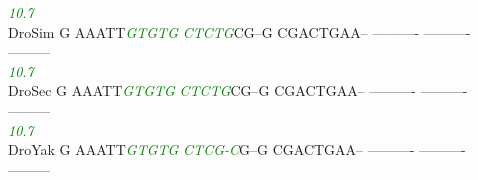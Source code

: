 \documentclass[11pt,twoside,reqno,a4paper]{article}
\begin{document}
{\hspace*{7\charwidth}\hspace*{1\charwidth}\hspace*{6\charwidth}\textit{\textcolor{Green}{10.7}}\hspace*{1\charwidth}\hspace*{1\charwidth}\hspace*{1\charwidth}\hspace*{1\charwidth}\hspace*{1\charwidth}\\
DroSim	G	AAATT\textit{\textcolor{Green}{G}}\textit{\textcolor{Green}{T}}\textit{\textcolor{Green}{G}}\textit{\textcolor{Green}{T}}\textit{\textcolor{Green}{G}}	\textit{\textcolor{Green}{C}}\textit{\textcolor{Green}{T}}\textit{\textcolor{Green}{C}}\textit{\textcolor{Green}{T}}\textit{\textcolor{Green}{G}}CG--G	CGACTGAA--	----------	----------	---------\\
\hspace*{7\charwidth}\hspace*{1\charwidth}\hspace*{6\charwidth}\textit{\textcolor{Green}{10.7}}\hspace*{1\charwidth}\hspace*{1\charwidth}\hspace*{1\charwidth}\hspace*{1\charwidth}\hspace*{1\charwidth}\\
DroSec	G	AAATT\textit{\textcolor{Green}{G}}\textit{\textcolor{Green}{T}}\textit{\textcolor{Green}{G}}\textit{\textcolor{Green}{T}}\textit{\textcolor{Green}{G}}	\textit{\textcolor{Green}{C}}\textit{\textcolor{Green}{T}}\textit{\textcolor{Green}{C}}\textit{\textcolor{Green}{T}}\textit{\textcolor{Green}{G}}CG--G	CGACTGAA--	----------	----------	---------\\
\hspace*{7\charwidth}\hspace*{1\charwidth}\hspace*{6\charwidth}\textit{\textcolor{Green}{10.7}}\hspace*{1\charwidth}\hspace*{1\charwidth}\hspace*{1\charwidth}\hspace*{1\charwidth}\hspace*{1\charwidth}\\
DroYak	G	AAATT\textit{\textcolor{Green}{G}}\textit{\textcolor{Green}{T}}\textit{\textcolor{Green}{G}}\textit{\textcolor{Green}{T}}\textit{\textcolor{Green}{G}}	\textit{\textcolor{Green}{C}}\textit{\textcolor{Green}{T}}\textit{\textcolor{Green}{C}}\textit{\textcolor{Green}{G}}\textit{\textcolor{Green}{-}}\textit{\textcolor{Green}{C}}G--G	CGACTGAA--	----------	----------	---------\\
}
\end{document}
